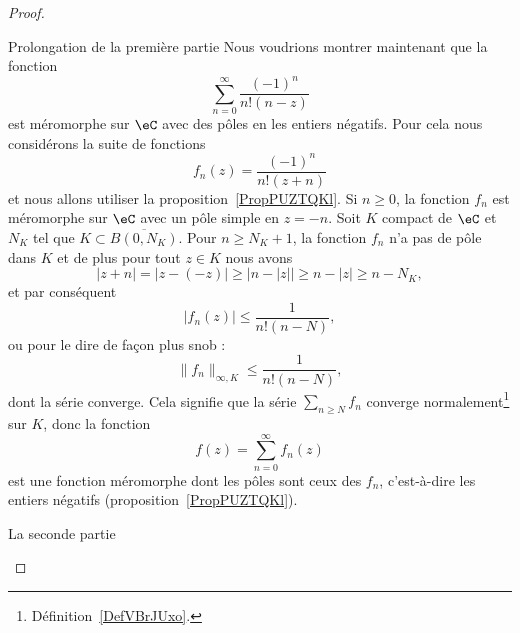 \begin{proof}
\begin{subproof}
		\item[Prolongation de la première partie] Nous voudrions montrer maintenant que la fonction
		\begin{equation}
			\sum_{n=0}^{\infty}\frac{ (-1)^n }{ n!(n-z) }
		\end{equation}
		est méromorphe sur \( \eC\) avec des pôles en les entiers négatifs. Pour cela nous considérons la suite de fonctions
		\begin{equation}
			f_n(z)=\frac{ (-1)^n }{ n!(z+n) }
		\end{equation}
		et nous allons utiliser la proposition~\ref{PropPUZTQKl}. Si \( n\geq 0\), la fonction \( f_n\) est méromorphe sur \( \eC\) avec un pôle simple en \( z=-n\). Soit \( K\) compact de \( \eC\) et \( N_K\) tel que \( K\subset\overline{ B(0,N_K) }\). Pour \( n\geq N_K+1\), la fonction \( f_n\) n'a pas de pôle dans \( K\) et de plus pour tout \( z\in K\) nous avons
		\begin{equation}
			| z+n |=| z-(-z) |\geq\big| n-| z | \big|\geq n-| z |\geq n-N_K,
		\end{equation}
		et par conséquent
		\begin{equation}
			| f_n(z) |\leq \frac{1}{ n!(n-N) },
		\end{equation}
		ou pour le dire de façon plus snob :
		\begin{equation}
			\| f_n \|_{\infty,K}\leq \frac{1}{ n!(n-N) },
		\end{equation}
		dont la série converge. Cela signifie que la série \( \sum_{n\geq N}f_n\) converge normalement\footnote{Définition~\ref{DefVBrJUxo}.} sur \( K\), donc la fonction
		\begin{equation}
			f(z)=\sum_{n=0}^{\infty}f_n(z)
		\end{equation}
		est une fonction méromorphe dont les pôles sont ceux des \( f_n\), c'est-à-dire les entiers négatifs (proposition~\ref{PropPUZTQKl}).

		\item[La seconde partie]


\end{subproof}
\end{proof}
